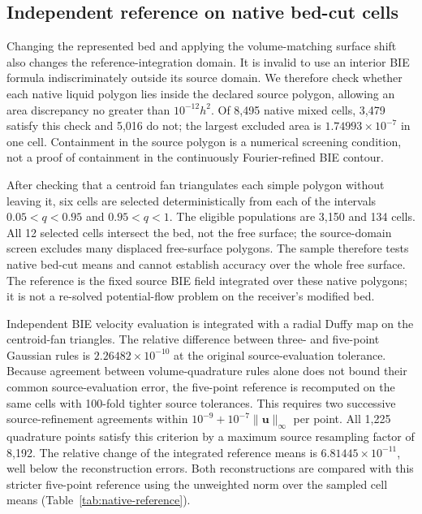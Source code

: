 \documentclass[10pt]{article}
\begin{document}
\subsection{Independent reference on native bed-cut cells}
Changing the represented bed and applying the volume-matching surface shift
also changes the reference-integration domain. It is invalid to use an
interior BIE formula indiscriminately outside its source domain. We therefore
check whether each native liquid polygon lies inside the declared source
polygon, allowing an area discrepancy no greater than $10^{-12}h^2$.
Of 8,495 native mixed cells, 3,479 satisfy this check and 5,016 do not;
the largest excluded area is $1.74993\times10^{-7}$ in one cell.
Containment in the source polygon is a numerical screening condition, not
a proof of containment in the continuously Fourier-refined BIE contour.

After checking that a centroid fan triangulates each simple polygon without
leaving it, six cells are selected deterministically
from each of the intervals $0.05<q<0.95$ and $0.95<q<1$.
The eligible populations are 3,150 and 134 cells. All 12 selected cells
intersect the bed, not the free surface; the source-domain screen excludes
many displaced free-surface polygons. The sample therefore tests native
bed-cut means and cannot establish accuracy over the whole free surface.
The reference is the fixed source BIE field integrated over these native
polygons; it is not a re-solved potential-flow problem on the receiver's
modified bed.

Independent BIE velocity evaluation is integrated with a radial Duffy map
on the centroid-fan triangles. The relative difference between three- and
five-point Gaussian rules is $2.26482\times10^{-10}$ at the original
source-evaluation tolerance. Because agreement between volume-quadrature
rules alone does not bound their common source-evaluation error, the
five-point reference is recomputed on the same cells with 100-fold
tighter source tolerances. This requires two successive source-refinement
agreements within $10^{-9}+10^{-7}\|\boldsymbol u\|_\infty$ per point.
All 1,225 quadrature points satisfy this criterion by a maximum source
resampling factor of 8,192. The relative change of the integrated reference
means is $6.81445\times10^{-11}$, well below the reconstruction errors.
Both reconstructions are compared with this stricter five-point reference
using the unweighted norm over the sampled cell means
(Table~\ref{tab:native-reference}).
\end{document}
